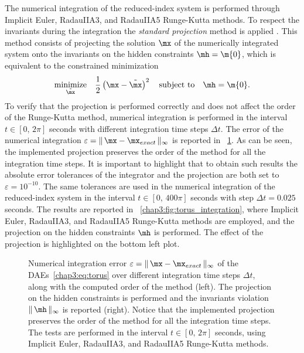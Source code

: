 The numerical integration of the reduced-index system is performed through Implicit Euler, RadauIIA3, and RadauIIA5 Runge-Kutta methods. To respect the invariants during the integration the \emph{standard projection} method is applied \cite{hairer2000symmetric}. This method consists of projecting the solution $\mx$ of the numerically integrated system onto the invariants on the hidden constraints $\mh = \m{0}$, which is equivalent to the constrained minimization
%
\begin{equation}
  \underset{\tilde{\mx}}{\textrm{minimize}} \quad \dfrac{1}{2}\left(\mx - \tilde{\mx}\right)^2
    \quad \textrm{subject to} \quad
    \mh = \m{0}.
\end{equation}
%
To verify that the projection is performed correctly and does not affect the order of the Runge-Kutta method, numerical integration is performed in the interval $t \in [0, \, 2\pi]$ seconds with different integration time steps $\Delta t$. The error of the numerical integration $\varepsilon = \| \, \mx - \mx_{exact} \, \|_{\infty}$ is reported in \figurename~\ref{chap3:fig:torus_order}. As can be seen, the implemented projection preserves the order of the method for all the integration time steps. It is important to highlight that to obtain such results the absolute error tolerances of the integrator and the projection are both set to $\varepsilon = 10^{-10}$. The same tolerances are used in the numerical integration of the reduced-index system in the interval $t \in [0, \, 400\pi]$ seconds with step $\Delta t = 0.025$ seconds. The results are reported in \figurename~\ref{chap3:fig:torus_integration}, where Implicit Euler, RadauIIA3, and RadauIIA5 Runge-Kutta methods are employed, and the projection on the hidden constraints $\mh$ is performed. The effect of the projection is highlighted on the bottom left plot.

\begin{figure}
  \centering
  \caption[
    Numerical integration error of the \acp{DAE}~\eqref{chap3:eq:torus} over different integration time steps, along with the computed order of the method.
  ]{
    Numerical integration error $\varepsilon = \| \, \mx - \mx_{exact} \, \|_{\infty}$ of the \acp{DAE}~\eqref{chap3:eq:torus} over different integration time steps $\Delta t$, along with the computed order of the method (left). The projection on the hidden constraints is performed and the invariants violation $\| \, \mh \, \|_{\infty}$ is reported (right). Notice that the implemented projection preserves the order of the method for all the integration time steps. The tests are performed in the interval $t \in [0, \, 2\pi]$ seconds, using Implicit Euler, RadauIIA3, and RadauIIA5 Runge-Kutta methods.
  }
  \label{chap3:fig:torus_order}
\end{figure}

